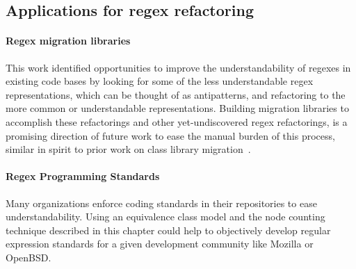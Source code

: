 \subsection{Applications for regex refactoring}

\paragraph{Regex migration libraries}
This work identified opportunities to improve the understandability of regexes in existing code bases by looking for some of the less understandable regex representations, which can be thought of as antipatterns, and refactoring to the more common or understandable representations.  Building migration libraries to accomplish these refactorings and other yet-undiscovered regex refactorings, is a promising direction of future work to ease the manual burden of this process, similar in spirit to prior work on class library migration~.

\paragraph{Regex Programming Standards}
Many organizations enforce coding standards in their repositories to ease understandability.  Using an equivalence class model and the node counting technique described in this chapter could help to objectively develop regular expression standards for a given development community like Mozilla or OpenBSD.

